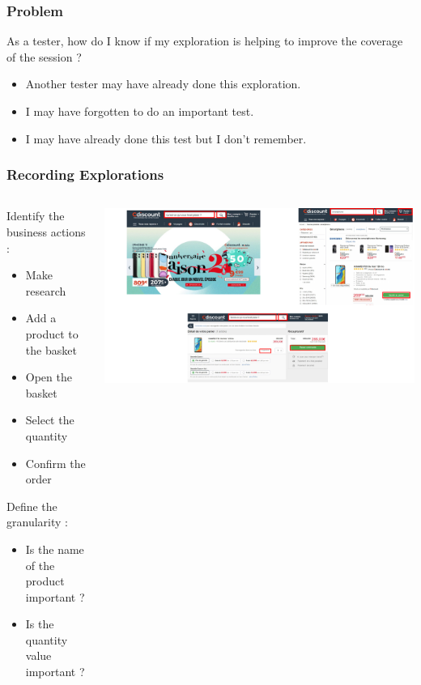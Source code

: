 \documentclass{beamer}
\begin{document}
\begin{frame}
    \frametitle{Problem}
    As a tester, how do I know if my exploration is helping to improve the coverage of the session ?
    \begin{itemize}
        \item Another tester may have already done this exploration.
        \item I may have forgotten to do an important test.
        \item I may have already done this test but I don't remember.
    \end{itemize}
    \end{frame}
    

\begin{frame}
    \frametitle{Recording Explorations}

    \begin{columns}[T]
        \begin{column}{.35\textwidth}

        Identify the business actions : 
        \begin{itemize}
            \item Make research
            \item Add a product to the basket
            \item Open the basket
            \item Select the quantity
            \item Confirm the order
        \end{itemize}
        Define the granularity :
        \begin{itemize}
            \item Is the name of the product important ?
            \item Is the quantity value important ?
        \end{itemize}
        \end{column}
        \begin{column}{.65\textwidth}
            \vspace{10mm} %
            \includegraphics[width=\textwidth]{img/actions.pdf}
        \end{column}
    \end{columns}
\end{frame}
    
\end{document}
